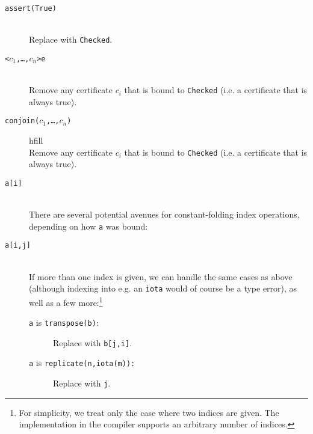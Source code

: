 \begin{description}
  \item[\texttt{assert(True)}]\hfill\\
    Replace with \texttt{Checked}.

  \item[\texttt{<$c_{1}$,\ldots,$c_{n}$>e}]\hfill\\
    Remove any certificate $c_{i}$ that is bound to \texttt{Checked}
    (i.e. a certificate that is always true).

  \item[\texttt{conjoin($c_{1}$,\ldots,$c_{n}$)}]hfill\\
    Remove any certificate $c_{i}$ that is bound to \texttt{Checked}
    (i.e. a certificate that is always true).

  \item[\texttt{a[i]}]\hfill\\
    There are several potential avenues for constant-folding index
    operations, depending on how \texttt{a} was bound:

  \item[\texttt{a[i,j]}]\hfill\\
    If more than one index is given, we can handle the same cases as
    above (although indexing into e.g. an \texttt{iota} would of
    course be a type error), as well as a few more:\footnote{For
      simplicity, we treat only the case where two indices are given.
      The implementation in the \LO{} compiler supports an arbitrary
      number of indices.}
    \begin{description}
    \item[\texttt{a} is \texttt{transpose(b)}:] Replace with
      \texttt{b[j,i]}.
    \item[\texttt{a} is \texttt{replicate(n,iota(m)):}] Replace with
      \texttt{j}.
    \end{description}
\end{description}


